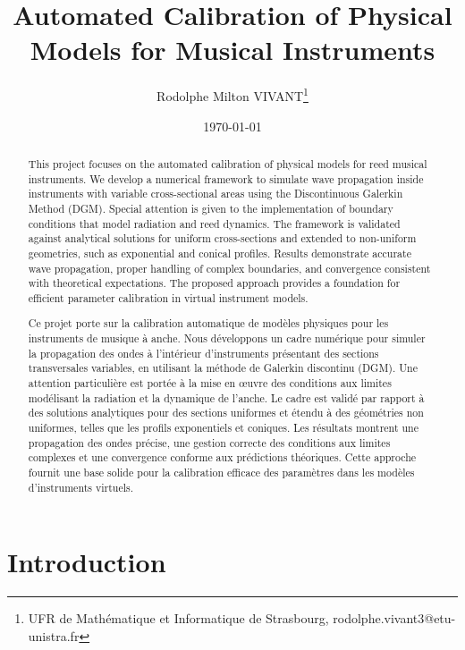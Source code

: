 \documentclass[11pt,a4paper]{report}
\title{Automated Calibration of Physical Models for Musical Instruments\\[0.5em]}
\author{Rodolphe Milton VIVANT\thanks{UFR de Mathématique et Informatique de Strasbourg, rodolphe.vivant3@etu-unistra.fr}}
\date{\today}
\theoremstyle{plain}
\theoremstyle{definition}
\begin{document}
\dominitoc
\maketitle

\begin{abstract}
This project focuses on the automated calibration of physical models for reed musical instruments. 
We develop a numerical framework to simulate wave propagation inside instruments with variable cross-sectional areas using the Discontinuous Galerkin Method (DGM). 
Special attention is given to the implementation of boundary conditions that model radiation and reed dynamics. 
The framework is validated against analytical solutions for uniform cross-sections and extended to non-uniform geometries, such as exponential and conical profiles. 
Results demonstrate accurate wave propagation, proper handling of complex boundaries, and convergence consistent with theoretical expectations. 
The proposed approach provides a foundation for efficient parameter calibration in virtual instrument models.



\vspace{3em}
Ce projet porte sur la calibration automatique de modèles physiques pour les instruments de musique à anche. 
Nous développons un cadre numérique pour simuler la propagation des ondes à l'intérieur d'instruments présentant des sections transversales variables, en utilisant la méthode de Galerkin discontinu (DGM). 
Une attention particulière est portée à la mise en œuvre des conditions aux limites modélisant la radiation et la dynamique de l'anche. 
Le cadre est validé par rapport à des solutions analytiques pour des sections uniformes et étendu à des géométries non uniformes, telles que les profils exponentiels et coniques. 
Les résultats montrent une propagation des ondes précise, une gestion correcte des conditions aux limites complexes et une convergence conforme aux prédictions théoriques. 
Cette approche fournit une base solide pour la calibration efficace des paramètres dans les modèles d'instruments virtuels.
\end{abstract}

\newpage
\setcounter{tocdepth}{2}
\tableofcontents

\newpage
\chapter{Introduction}
\end{document}
